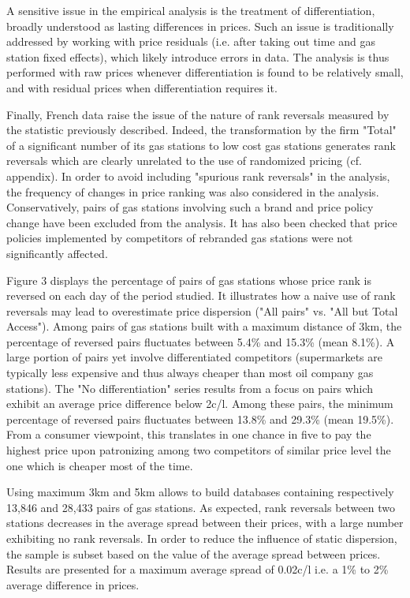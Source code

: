 \documentclass[english]{article}
\begin{document}
A sensitive issue in the empirical analysis is the treatment of differentiation, broadly understood as lasting differences in prices. Such an issue is traditionally addressed by working with price residuals (i.e. after taking out time and gas station fixed effects), which likely introduce errors in data. The analysis is thus performed with raw prices whenever differentiation is found to be relatively small, and with residual prices when differentiation requires it.

Finally, French data raise the issue of the nature of rank reversals measured by the statistic previously described. Indeed, the transformation by the firm "Total" of a significant number of its gas stations to low cost gas stations generates rank reversals which are clearly unrelated to the use of randomized pricing (cf. appendix). In order to avoid including "spurious rank reversals" in the analysis, the frequency of changes in price ranking was also considered in the analysis. Conservatively, pairs of gas stations involving such a brand and price policy change have been excluded from the analysis. It has also been checked that price policies implemented by competitors of rebranded gas stations were not significantly affected.



Figure 3 displays the percentage of pairs of gas stations whose price rank is reversed on each day of the period studied. It illustrates how a naive use of rank reversals may lead to overestimate price dispersion ("All pairs" vs. "All but Total Access"). Among pairs of gas stations built with a maximum distance of 3km, the percentage of reversed pairs fluctuates between 5.4\% and 15.3\%  (mean 8.1\%). A large portion of pairs yet involve differentiated competitors (supermarkets are typically less expensive and thus always cheaper than most oil company gas stations). The "No differentiation" series results from a focus on pairs which exhibit an average price difference below 2c/l. Among these pairs, the minimum percentage of reversed pairs fluctuates between 13.8\% and 29.3\% (mean 19.5\%). From a consumer viewpoint, this translates in one chance in five to pay the highest price upon patronizing among two competitors of similar price level the one which is cheaper most of the time.

Using maximum 3km and 5km allows to build databases containing respectively 13,846 and 28,433 pairs of gas stations. As expected, rank reversals between two stations decreases in the average spread between their prices, with a large number exhibiting no rank reversals. In order to reduce the influence of static dispersion, the sample is subset based on the value of the average spread between prices. Results are presented for a maximum average spread of 0.02c/l i.e. a 1\% to 2\% average difference in prices.
\end{document}
